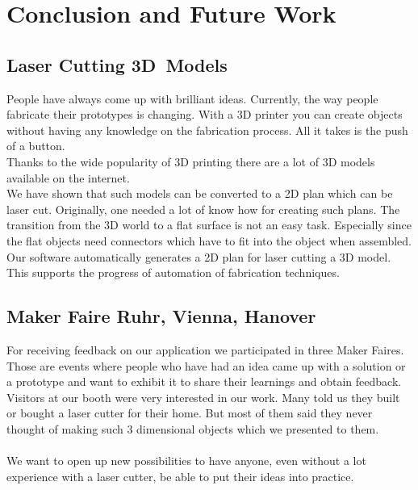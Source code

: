 \documentclass[../ClassicThesis.tex]{subfiles}
\begin{document}
\chapter{Conclusion and Future Work}\label{ch:conclusion}

\section{Laser Cutting 3D~Models}
People have always come up with brilliant ideas. Currently, the way people fabricate their prototypes is changing. With a 3D printer you can create objects without having any knowledge on the fabrication process. All it takes is the push of a button.\\
Thanks to the wide popularity of 3D printing there are a lot of 3D models available on the internet.\\
We have shown that such models can be converted to a 2D plan which can be laser cut. Originally, one needed a lot of know how for creating such plans. The transition from the 3D world to a flat surface is not an easy task. Especially since the flat objects need connectors which have to fit into the object when assembled. \\
Our software automatically generates a 2D plan for laser cutting a 3D model. This supports the progress of automation of fabrication techniques. 

\section{Maker Faire Ruhr, Vienna, Hanover}
For receiving feedback on our application we participated in three Maker Faires. \\
Those are events where people who have had an idea came up with a solution or a prototype and want to exhibit it to share their learnings and obtain feedback.\\
Visitors at our booth were very interested in our work. Many told us they built or bought a laser cutter for their home. But most of them said they never thought of making such 3 dimensional objects which we presented to them. 
\\\*\\
We want to open up new possibilities to have anyone, even without a lot experience with a laser cutter, be able to put their ideas into practice.
\end{document}
